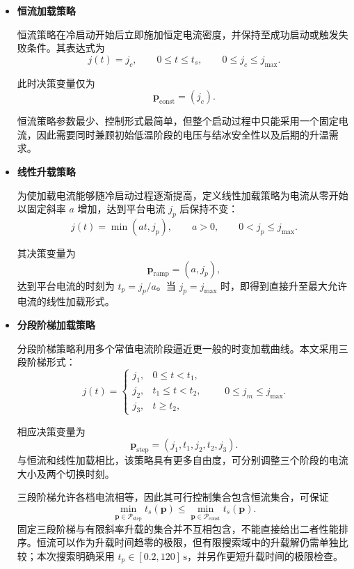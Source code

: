 \documentclass[bwprint]{gmcmthesis}
\numberwithin{equation}{section}
\numberwithin{figure}{section}
\begin{document}
\begin{itemize}
\renewcommand{\labelitemi}{$\blacktriangleright$}
\item \textbf {恒流加载策略}

 恒流策略在冷启动开始后立即施加恒定电流密度，并保持至成功启动或触发失败条件。其表达式为
\begin{equation}
j(t) = j_c, \qquad 0 \leq t \leq t_s, \qquad 0 \leq j_c \leq j_{\text{max}}. \label{eq:src:5-51}
\end{equation}

 此时决策变量仅为
\[
\mathbf{p}_{\text{const}} = (j_c).
\]

 恒流策略参数最少、控制形式最简单，但整个启动过程中只能采用一个固定电流，因此需要同时兼顾初始低温阶段的电压与结冰安全性以及后期的升温需求。


\item \textbf {线性升载策略}

 为使加载电流能够随冷启动过程逐渐提高，定义线性加载策略为电流从零开始以固定斜率 \(a\) 增加，达到平台电流 \(j_p\) 后保持不变：
\begin{equation}
j(t) = \min(at, j_p), \qquad a > 0, \qquad 0 < j_p \leq j_{\text{max}}. \label{eq:src:5-52}
\end{equation}

 其决策变量为
\[
\mathbf{p}_{\text{ramp}} = (a, j_p),
\]
达到平台电流的时刻为 \(t_p = j_p / a\)。当 \(j_p = j_{\text{max}}\) 时，即得到直接升至最大允许电流的线性加载形式。

\item \textbf {分段阶梯加载策略}

 分段阶梯策略利用多个常值电流阶段逼近更一般的时变加载曲线。本文采用三段阶梯形式：
\begin{equation}
j(t) = \begin{cases}
j_1, & 0 \leq t < t_1, \\
j_2, & t_1 \leq t < t_2, \\
j_3, & t \geq t_2,
\end{cases} \qquad 0 \leq j_m \leq j_{\text{max}}. \label{eq:src:5-53}
\end{equation}

 相应决策变量为
\[
\mathbf{p}_{\text{step}} = (j_1, t_1, j_2, t_2, j_3).
\]
与恒流和线性加载相比，该策略具有更多自由度，可分别调整三个阶段的电流大小及两个切换时刻。

三段阶梯允许各档电流相等，因此其可行控制集合包含恒流集合，可保证
\begin{equation}
\min_{\mathbf p\in\mathcal P_{\mathrm{step}}}t_s(\mathbf p)\leq\min_{\mathbf p\in\mathcal P_{\mathrm{const}}}t_s(\mathbf p).\label{eq:src:5-54}
\end{equation}
固定三段阶梯与有限斜率升载的集合并不互相包含，不能直接给出二者性能排序。恒流可以作为升载时间趋零的极限，但有限搜索域中的升载解仍需单独比较；本次搜索明确采用 $t_p\in[0.2,120]\,\mathrm s$，并另作更短升载时间的极限检查。

\end{itemize}
\end{document}
